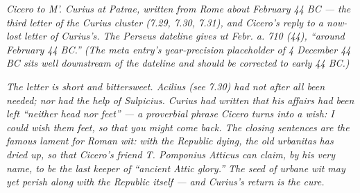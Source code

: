 
\textit{Cicero to M'. Curius at Patrae, written from Rome about
February 44 BC --- the third letter of the Curius cluster (7.29,
7.30, 7.31), and Cicero's reply to a now-lost letter of Curius's.
The Perseus dateline gives \textit{ut Febr. a. 710 (44)}, ``around
February 44 BC.'' (The meta entry's year-precision placeholder of
4 December 44 BC sits well downstream of the dateline and should
be corrected to early 44 BC.)}

\textit{The letter is short and bittersweet. Acilius (see 7.30) had
not after all been needed; nor had the help of Sulpicius. Curius
had written that his affairs had been left ``neither head nor
feet'' --- a proverbial phrase Cicero turns into a wish: \textit{I
could wish them feet, so that you might come back}. The closing
sentences are the famous lament for Roman wit: with the Republic
dying, the old \textit{urbanitas} has dried up, so that Cicero's
friend T. Pomponius Atticus can claim, by his very name, to be the
last keeper of ``ancient Attic glory.'' The seed of urbane wit may
yet perish along with the Republic itself --- and Curius's return
is the cure.}
